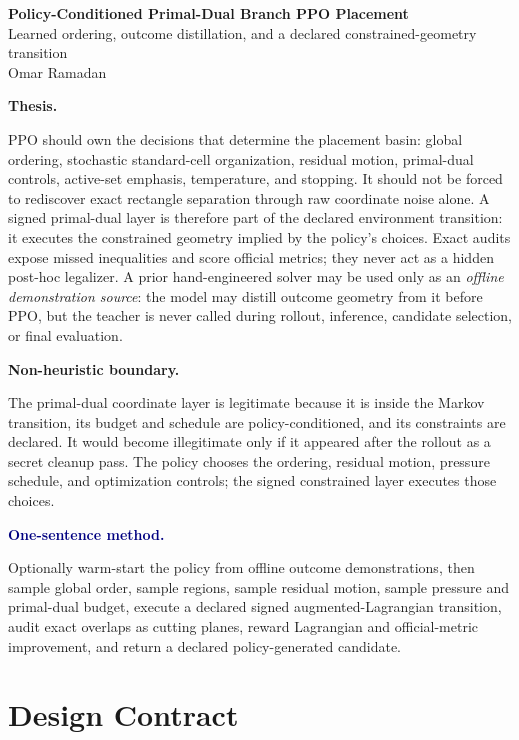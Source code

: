 \documentclass[11pt]{article}
\newcommand{\callout}[3]{%
\medskip\noindent\textbf{\textcolor{#1}{#2.}}\par\noindent #3\par\medskip
}
\begin{document}
\begin{center}
{\Huge\bfseries\color{navy} Policy-Conditioned Primal-Dual Branch PPO Placement}\\[0.25em]
{\Large\color{graytext} Learned ordering, outcome distillation, and a declared constrained-geometry transition}\\[0.8em]
{\large Omar Ramadan}
\end{center}

\callout{green!70!black}{Thesis}{PPO should own the decisions that determine the placement basin: global ordering, stochastic standard-cell organization, residual motion, primal-dual controls, active-set emphasis, temperature, and stopping. It should not be forced to rediscover exact rectangle separation through raw coordinate noise alone. A signed primal-dual layer is therefore part of the declared environment transition: it executes the constrained geometry implied by the policy's choices. Exact audits expose missed inequalities and score official metrics; they never act as a hidden post-hoc legalizer. A prior hand-engineered solver may be used only as an \emph{offline demonstration source}: the model may distill outcome geometry from it before PPO, but the teacher is never called during rollout, inference, candidate selection, or final evaluation.}

\callout{orange!80!black}{Non-heuristic boundary}{The primal-dual coordinate layer is legitimate because it is inside the Markov transition, its budget and schedule are policy-conditioned, and its constraints are declared. It would become illegitimate only if it appeared after the rollout as a secret cleanup pass. The policy chooses the ordering, residual motion, pressure schedule, and optimization controls; the signed constrained layer executes those choices.}

\callout{navy}{One-sentence method}{Optionally warm-start the policy from offline outcome demonstrations, then sample global order, sample regions, sample residual motion, sample pressure and primal-dual budget, execute a declared signed augmented-Lagrangian transition, audit exact overlaps as cutting planes, reward Lagrangian and official-metric improvement, and return a declared policy-generated candidate.}

\section{Design Contract}
\end{document}

